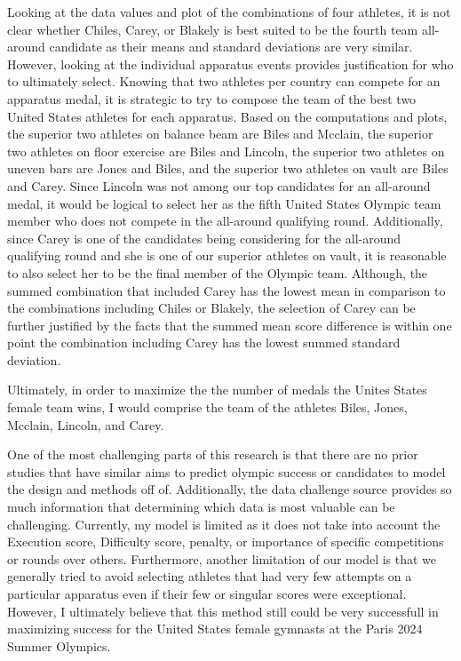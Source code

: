 \documentclass[12pt]{article}
\begin{document}
Looking at the data values and plot of the combinations of four athletes, it is not clear whether Chiles, Carey, or 
Blakely is best suited to be the fourth team all-around candidate as their means and standard deviations are very 
similar. However, looking at the individual apparatus events provides justification for who to ultimately select. 
Knowing that two athletes per country can compete for an apparatus medal, it is strategic to try to compose the 
team of the best two United States athletes for each apparatus. Based on the computations and plots, the superior two 
athletes on balance beam are Biles and Mcclain, the superior two athletes on floor exercise are Biles and Lincoln, 
the superior two athletes on uneven bars are Jones and Biles, and the superior two athletes on vault are Biles 
and Carey. Since Lincoln was not among our top candidates for an all-around medal, it would be logical to select her 
as the fifth United States Olympic team member who does not compete in the all-around qualifying round. Additionally, 
since Carey is one of the candidates being considering for the all-around qualifying round and she is one of our superior 
athletes on vault, it is reasonable to also select her to be the final member of the Olympic team. Although, the 
summed combination that included Carey has the lowest mean in comparison to the combinations including Chiles or 
Blakely, the selection of Carey can be further justified by the facts that the summed mean score difference is 
within one point the combination including Carey has the lowest summed standard deviation.

Ultimately, in order to maximize the the number of medals the Unites States female team wins, I would comprise the 
team of the athletes Biles, Jones, Mcclain, Lincoln, and Carey.

One of the most challenging parts of this research is that there are no prior studies that have similar
aims to predict olympic success or candidates to model the design and methods off of. Additionally, 
the data challenge source provides so much information that determining which data is most valuable 
can be challenging. Currently, my model is limited as it does not take into account the 
Execution score, Difficulty score, penalty, or importance of specific competitions or rounds over others. 
Furthermore, another limitation of our model is that we generally tried to avoid selecting athletes that
had very few attempts on a particular apparatus even if their few or singular scores were exceptional. However, 
I ultimately believe that this method still could be very successfull in maximizing success for the United States 
female gymnasts at the Paris 2024 Summer Olympics.



\end{document}
